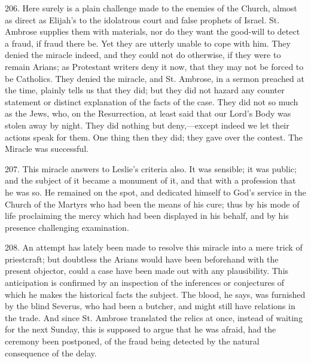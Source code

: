 206.
Here surely is a plain challenge made to the enemies of the Church,
almost as direct as Elijah's to the idolatrous court and false
prophets of Israel. St. Ambrose supplies them with materials, nor do
they want the good-will to detect a fraud, if fraud there be. Yet they
are utterly unable to cope with him. They denied the miracle indeed,
and they could not do otherwise, if they were to remain Arians; as
Protestant writers deny it now, that they may not be forced to be
Catholics. They denied the miracle, and St. Ambrose, in a sermon
preached at the time, plainly tells us that they did; but they did not
hazard any counter statement or distinct explanation of the facts of
the case. They did not so much as the Jews, who, on the Resurrection,
at least said that our Lord's Body was stolen away by night. They did
nothing but deny,—except indeed we let their actions speak for them.
One thing then they did; they gave over the contest. The Miracle was
successful.

207.
This miracle answers to Leslie's criteria also. It was sensible; it
was public; and the subject of it became a monument of it, and that
with a profession that he was so. He remained on the spot, and
dedicated himself to God's service in the Church of the Martyrs who
had been the means of his cure; thus by his mode of life proclaiming
the mercy which had been displayed in his behalf, and by his presence
challenging examination.

208.
An attempt has lately been made to resolve this miracle into a mere
trick of priestcraft; but doubtless the Arians would have been
beforehand with the present objector, could a case have been made out
with any plausibility. This anticipation is confirmed by an inspection
of the inferences or conjectures of which he makes the historical
facts the subject. The blood, he says, was furnished by the blind
Severus, who had been a butcher, and might still have relations in the
trade. And since St. Ambrose translated the relics at once, instead of
waiting for the next Sunday, this is supposed to argue that he was
afraid, had the ceremony been postponed, of the fraud being detected
by the natural consequence of the delay.

